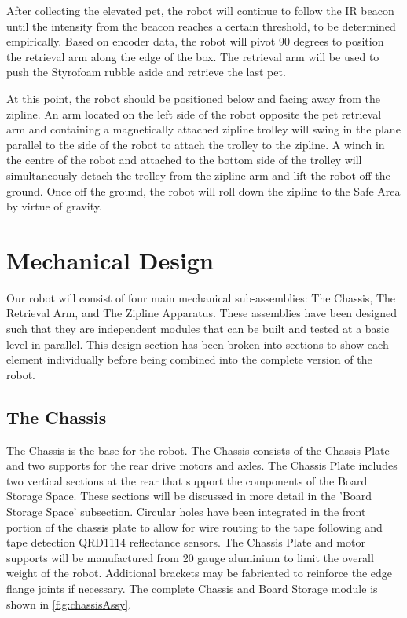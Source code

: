 \documentclass[11pt, oneside]{article} %
\begin{document}
After collecting the elevated pet, the robot will continue to follow the IR beacon until the intensity from the beacon reaches a certain threshold, to be determined empirically. Based on encoder data, the robot will pivot 90 degrees to position the retrieval arm along the edge of the box. The retrieval arm will be used to push the Styrofoam rubble aside and retrieve the last pet.

At this point, the robot should be positioned below and facing away from the zipline. An arm located on the left side of the robot opposite the pet retrieval arm and containing a magnetically attached zipline trolley will swing in the plane parallel to the side of the robot to attach the trolley to the zipline. A winch in the centre of the robot and attached to the bottom side of the trolley will simultaneously detach the trolley from the zipline arm and lift the robot off the ground. Once off the ground, the robot will roll down the zipline to the Safe Area by virtue of gravity.

\section{Mechanical Design}

Our robot will consist of four main mechanical sub-assemblies: The Chassis, The Retrieval Arm, and The Zipline Apparatus. These assemblies have been designed such that they are independent modules that can be built and tested at a basic level in parallel. This design section has been broken into sections to show each element individually before being combined into the complete version of the robot.

	\subsection{The Chassis}

	The Chassis is the base for the robot. The Chassis consists of the Chassis Plate and two supports for the rear drive motors and axles. The Chassis Plate includes two vertical sections at the rear that support the components of the Board Storage Space. These sections will be discussed in more detail in the 'Board Storage Space' subsection. Circular holes have been integrated in the front portion of the chassis plate to allow for wire routing to the tape following and tape detection QRD1114 reflectance sensors. The Chassis Plate and motor supports will be manufactured from 20 gauge aluminium to limit the overall weight of the robot. Additional brackets may be fabricated to reinforce the edge flange joints if necessary. The complete Chassis and Board Storage module is shown in \autoref{fig:chassisAssy}.
\end{document}

